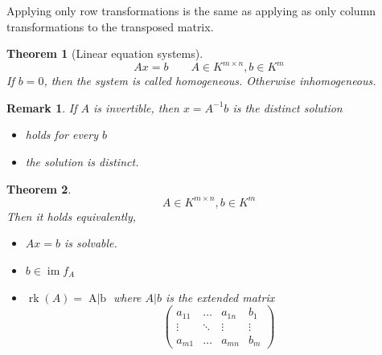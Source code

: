\documentclass[a4paper,landscape,twocolumn]{article}
\newtheorem{theorem}{Theorem}[section]
\newtheorem{rem}{Remark}[section]
\DeclareMathOperator\image{im} %
\begin{document}
Applying only row transformations is the same as applying as only column transformations to the transposed matrix.

\begin{theorem}[Linear equation systems]
  \[ Ax = b \qquad A \in K^{m\times n}, b \in K^m \]
  If $b=0$, then the system is called \emph{homogeneous}. Otherwise \emph{inhomogeneous}.
\end{theorem}
\begin{rem}
  If $A$ is invertible, then $x = A^{-1} b$ is the distinct solution
  \begin{itemize}
    \item holds for every $b$
    \item the solution is distinct.
  \end{itemize}
\end{rem}
\begin{theorem}
  \label{satz-6.43}
  \[ A \in K^{m\times n}, b \in K^m \]
  Then it holds equivalently,
  \begin{itemize}
    \item $Ax = b$ is solvable.
    \item $b \in \image{f_A}$
    \item $\operatorname{rk}(A) = \operatorname{A | b}$
      where $A | b$ is the extended matrix
      \[
        \begin{pmatrix}
          a_{11} & \ldots & a_{1n} & b_1 \\
          \vdots & \ddots & \vdots & \vdots \\
          a_{m1} & \ldots & a_{mn} & b_m
        \end{pmatrix}
      \]
  \end{itemize}
\end{theorem}
\end{document}
